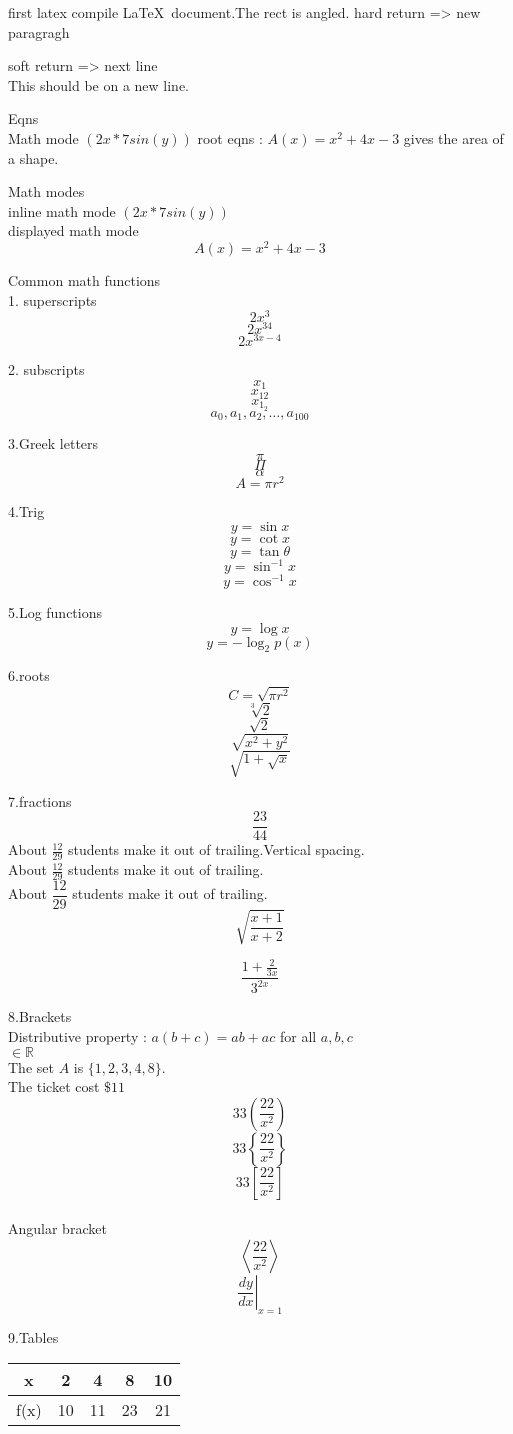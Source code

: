 \documentclass[11pt ]{article}
\begin{document}
	first latex compile \LaTeX\ document.The rect is angled.
	hard return => new paragragh
	
	soft return => next line\\This should be on a new line.
	
	Eqns \\ Math mode $(2x *7sin(y))$
	root eqns : $A(x)=x^2+4x-3$ gives the area of a shape.
	
	Math modes \\
	inline math mode 
	$(2x *7sin(y))$\\
	displayed math mode
	$${A(x)=x^2+4x-3}$$

	
	Common math functions \\
	1. superscripts $$2x^3$$ 
	$$2x^{34}$$
	$$2x^{3x-4}$$
	
	2. subscripts
	$$x_1$$
	$$x_{12}$$
	$$x_{1_2}$$
	$$a_0,a_1,a_2,\ldots,a_{100}$$
	
	3.Greek letters
	$$\pi$$
	$$\Pi$$
	$$\alpha$$
	$$A=\pi r^2$$
	
	4.Trig
	$$y=\sin x$$
	$$y=\cot x$$
	$$y=\tan \theta$$
	$$y=\sin^{-1} x$$ 
	$$y=\cos^{-1} x$$
	
	
	5.Log functions
	$$y=\log x$$
	$$y=- \log_2 p(x)$$
	
	6.roots
	$$C=\sqrt{\pi r^2}$$
	$$\sqrt[3]{2} $$
	$$\sqrt{2}$$
	$$\sqrt{x^2 + y^2} $$
	$$\sqrt{ 1 + \sqrt{x}} $$
	
	7.fractions
	$$\frac{23}{44}$$
	About $\displaystyle \frac{12}{29}$ students make it out of trailing.Vertical spacing.\\ [7pt]
		About $\frac{12}{29}$ students make it out of trailing.\\ [7pt]
About $\dfrac{12}{29}$ students make it out of trailing.\\
$$\sqrt{\frac{x+1}{x+2}}$$

$$\frac{1+\frac{2}{3x}}{3^{2x}}$$

	8.Brackets\\
	Distributive  property : $a(b+c)=ab+ac$ for all $a, b, c $\\ $\in \mathbb{R}$\\
	The set $A$ is ${\{1,2,3,4,8\}}$.\\
	The ticket cost $\$11$
	$$33\left(\frac{22}{x^2}\right)$$
	$$33\left \{\frac{22}{x^2}\right \}$$
$$33\left[\frac{22}{x^2}\right]$$\\
Angular bracket
$$\left \langle \frac{22}{x^2}\right \rangle $$
$$\left.\frac{dy}{dx}\right|_{x=1}$$

	9.Tables\\
	\begin{tabular}{|c|c|c|c|c|}
		\hline
		x & 2 & 4  &8 &10 \\ \hline
		f(x) & 10 &11 &23 &21 \\ \hline
	\end{tabular}
	
\end{document}
